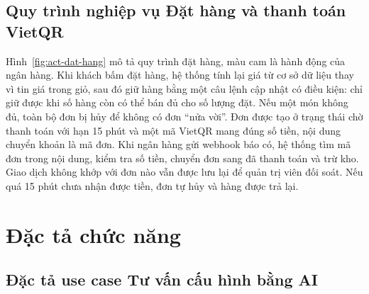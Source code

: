 \subsection{Quy trình nghiệp vụ Đặt hàng và thanh toán VietQR}


Hình~\ref{fig:act-dat-hang} mô tả quy trình đặt hàng, màu cam là hành động của ngân hàng. Khi khách bấm đặt hàng, hệ thống tính lại giá từ cơ sở dữ liệu thay vì tin giá trong giỏ, sau đó giữ hàng bằng một câu lệnh cập nhật có điều kiện: chỉ giữ được khi số hàng còn có thể bán đủ cho số lượng đặt. Nếu một món không đủ, toàn bộ đơn bị hủy để không có đơn ``nửa vời''. Đơn được tạo ở trạng thái chờ thanh toán với hạn 15 phút và một mã VietQR mang đúng số tiền, nội dung chuyển khoản là mã đơn. Khi ngân hàng gửi webhook báo có, hệ thống tìm mã đơn trong nội dung, kiểm tra số tiền, chuyển đơn sang đã thanh toán và trừ kho. Giao dịch không khớp với đơn nào vẫn được lưu lại để quản trị viên đối soát. Nếu quá 15 phút chưa nhận được tiền, đơn tự hủy và hàng được trả lại.

\section{Đặc tả chức năng}

\subsection{Đặc tả use case Tư vấn cấu hình bằng AI}

